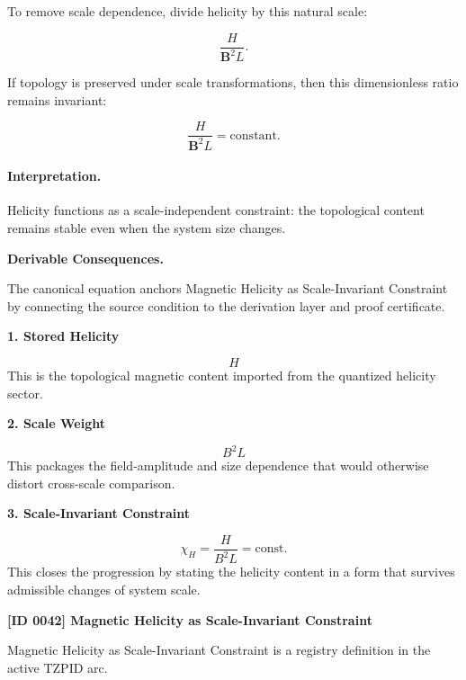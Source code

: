 To remove scale dependence, divide helicity by this natural scale:

\begin{equation}
\frac{H}{\mathbf{B}^2L}.
\end{equation}

If topology is preserved under scale transformations, then this dimensionless ratio remains invariant:

\begin{equation}
\boxed{
\frac{H}{\mathbf{B}^2 L}
=
\mathrm{constant}.
}
\end{equation}

\paragraph{Interpretation.}
Helicity functions as a scale-independent constraint: the topological content remains stable even when the system size changes.

\par\vspace{0.35em}
\noindent\textbf{Derivable Consequences.}\quad
\begingroup
\footnotesize
\raggedright
The canonical equation anchors Magnetic Helicity as Scale-Invariant Constraint by connecting the source condition to the derivation layer and proof certificate.
\par\endgroup

\noindent\textbf{1. Stored Helicity}\par
\[
H
\]
\noindent This is the topological magnetic content imported from the quantized helicity sector.\par
\noindent\textbf{2. Scale Weight}\par
\[
B^{2}L
\]
\noindent This packages the field-amplitude and size dependence that would otherwise distort cross-scale comparison.\par
\noindent\textbf{3. Scale-Invariant Constraint}\par
\[
\chi_{H}
=
\frac{H}{B^{2}L}
=
\mathrm{const.}
\]
\noindent This closes the progression by stating the helicity content in a form that survives admissible changes of system scale.\par

\clearpage
\noindent\textbf{[ID 0042] Magnetic Helicity as Scale-Invariant Constraint}\par
\vspace{0.35em}
\begingroup\small
{}
Magnetic Helicity as Scale-Invariant Constraint is a registry definition in the active TZPID arc.

